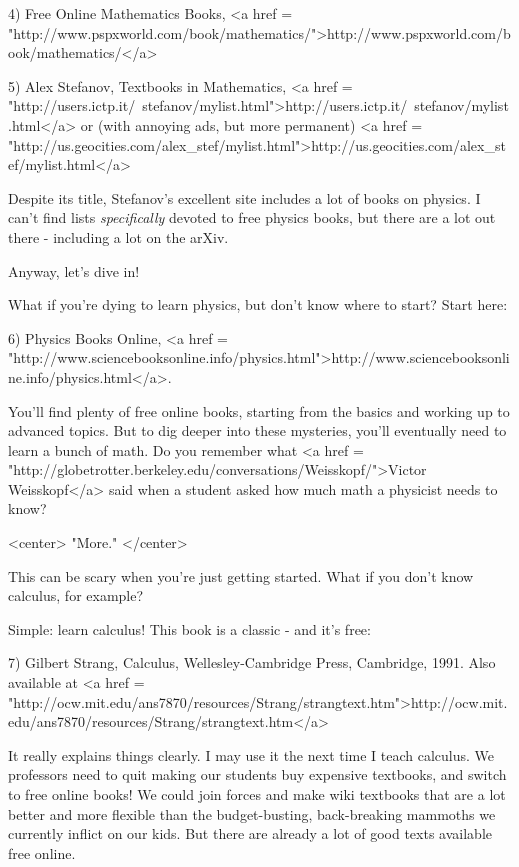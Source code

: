 4) Free Online Mathematics Books, 
<a href = "http://www.pspxworld.com/book/mathematics/">http://www.pspxworld.com/book/mathematics/</a>

5) Alex Stefanov, Textbooks in Mathematics, 
<a href = "http://users.ictp.it/~stefanov/mylist.html">http://users.ictp.it/~stefanov/mylist.html</a>
or (with annoying ads,
but more permanent) <a href = "http://us.geocities.com/alex_stef/mylist.html">http://us.geocities.com/alex_stef/mylist.html</a>

Despite its title, Stefanov's excellent site includes a lot of 
books on physics.  I can't find lists \emph{specifically} devoted to
free physics books, but there are a lot out there - including a lot on 
the arXiv.  

Anyway, let's dive in!

What if you're dying to learn physics, but don't know where to start?  
Start here:

6) Physics Books Online, <a href = "http://www.sciencebooksonline.info/physics.html">http://www.sciencebooksonline.info/physics.html</a>. 

You'll find plenty of free online books, starting from the basics
and working up to advanced topics.  But to dig deeper into these
mysteries, you'll eventually need to learn a bunch of math.  Do you 
remember what 
<a href = "http://globetrotter.berkeley.edu/conversations/Weisskopf/">Victor
Weisskopf</a> said when a student asked how much math a physicist needs to
know?  

<center>
"More."
</center>

This can be scary when you're just getting started.
What if you don't know calculus, for example?

Simple: learn calculus!  This book is a classic - and it's free:

7) Gilbert Strang, Calculus, Wellesley-Cambridge Press, Cambridge,
1991.  Also available at 
<a href = "http://ocw.mit.edu/ans7870/resources/Strang/strangtext.htm">http://ocw.mit.edu/ans7870/resources/Strang/strangtext.htm</a>

It really explains things clearly.  I may use it the next time I 
teach calculus.  We professors need to quit making our students
buy expensive textbooks, and switch to free online books!  We could
join forces and make wiki textbooks that are a lot better and
more flexible than the budget-busting, back-breaking mammoths we 
currently inflict on our kids.  But there are already a lot of good
texts available free online.  

